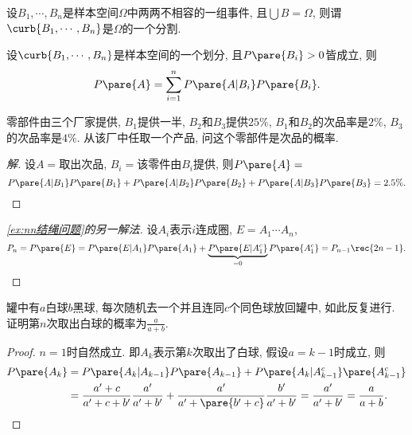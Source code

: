 \documentclass{ctexart}
\begin{document}
\begin{definition}[样本空间的划分]
    设$B_1,\cdots, B_n$是样本空间$\Omega$中两两不相容的一组事件, 且$\bigcup B = \Omega$, 则谓$\curb{B_1,\cdots, B_n}$是$\Omega$的一个分割.
\end{definition}
\begin{finale}
    \begin{theorem}[全概率公式]
        设$\curb{B_1,\cdots,B_n}$是样本空间的一个划分, 且$P\pare{B_i} > 0$皆成立, 则
        \[ P\pare{A} = \sum_{i=1}^n P\pare{A\vert B_i} P\pare{B_i}. \]
    \end{theorem}
\end{finale}
\begin{sample}
    \begin{ex}
        零部件由三个厂家提供, $B_1$提供一半, $B_2$和$B_3$提供$25\%$, $B_1$和$B_2$的次品率是$2\%$, $B_3$的次品率是$4\%$. 从该厂中任取一个产品, 问这个零部件是次品的概率.
    \end{ex}
    \begin{proof}[解]
        设$A=$取出次品, $B_i=$该零件由$B_i$提供, 则$P\pare{A} = $
        \[ P\pare{A\vert B_1}P\pare{B_1} + P\pare{A\vert B_2}P\pare{B_2} + P\pare{A\vert B_3}P\pare{B_3} = 2.5\%. \qedhere \]
\end{proof}
\end{sample}
\begin{sample}
    \begin{proof}[\cref{ex:nn结绳问题}的另一解法]
        设$A_i$表示$i$连成圈, $E=A_1\cdots A_n$,
        \[ P_n = P\pare{E} = P\pare{E\vert A_1}P\pare{A_1} + \underbrace{P\pare{E\vert A_1^c}}_{=0}P\pare{A_1^c} = P_{n-1}\rec{2n-1}.\qedhere \]
    \end{proof}
\end{sample}
\begin{sample}
    \begin{ex}[Polya罐子模型]
        罐中有$a$白球$b$黑球, 每次随机去一个并且连同$c$个同色球放回罐中, 如此反复进行. 证明第$n$次取出白球的概率为$\displaystyle \frac{a}{a+b}$.
    \end{ex}
    \begin{proof}
        $n=1$时自然成立. 即$A_k$表示第$k$次取出了白球, 假设$a=k-1$时成立, 则
        \begin{align*}
            P\pare{A_k} &= P\pare{A_k\vert A_{k-1}}P\pare{A_{k-1}} + P\pare{A_{k}\vert A_{k-1}^c}\pare{A_{k-1}^c}\\ &= \frac{a'+c}{a'+c+b'}\frac{a'}{a'+b'} + \frac{a'}{a'+\pare{b'+c}}\frac{b'}{a'+b'} = \frac{a'}{a'+b'} = \frac{a}{a+b}.\qedhere 
        \end{align*}
    \end{proof}
\end{sample}
\end{document}
